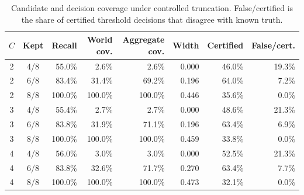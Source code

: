 \begin{table}[t]
\caption{Candidate and decision coverage under controlled truncation. False/certified is the share of certified threshold decisions that disagree with known truth.}
\label{tab:truth-joint-coverage}
\small\centering
\begin{tabular}{@{}ccrrrrrr@{}}
\toprule
$C$ & Kept & Recall & World cov. & Aggregate cov. & Width & Certified & False/cert. \\
\midrule
2 & 4/8 & 55.0\% & 2.6\% & 2.6\% & 0.000 & 46.0\% & 19.3\% \\
2 & 6/8 & 83.4\% & 31.4\% & 69.2\% & 0.196 & 64.0\% & 7.2\% \\
2 & 8/8 & 100.0\% & 100.0\% & 100.0\% & 0.446 & 35.6\% & 0.0\% \\
3 & 4/8 & 55.4\% & 2.7\% & 2.7\% & 0.000 & 48.6\% & 21.3\% \\
3 & 6/8 & 83.8\% & 31.9\% & 71.1\% & 0.196 & 63.4\% & 6.9\% \\
3 & 8/8 & 100.0\% & 100.0\% & 100.0\% & 0.459 & 33.8\% & 0.0\% \\
4 & 4/8 & 56.0\% & 3.0\% & 3.0\% & 0.000 & 52.5\% & 21.3\% \\
4 & 6/8 & 83.8\% & 32.6\% & 71.7\% & 0.270 & 63.4\% & 7.7\% \\
4 & 8/8 & 100.0\% & 100.0\% & 100.0\% & 0.473 & 32.1\% & 0.0\% \\
\bottomrule
\end{tabular}
\end{table}
